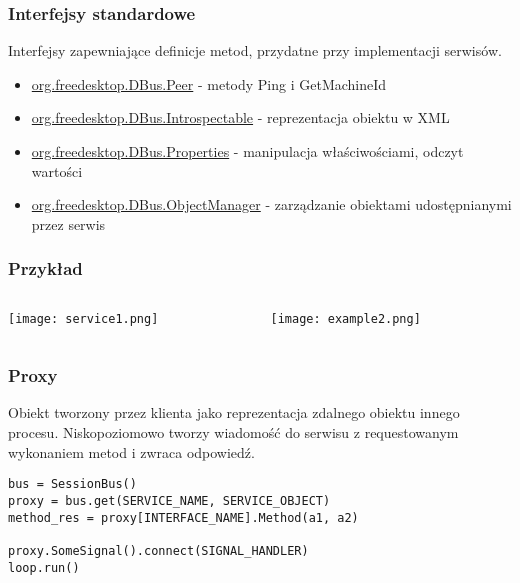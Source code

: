 \begin{frame}
    \frametitle{Interfejsy standardowe}
    Interfejsy zapewniające definicje metod, 
    przydatne przy implementacji serwisów.
    \begin{itemize}
        \item \href{https://dbus.freedesktop.org/doc/dbus-java/api/org/freedesktop/DBus.Peer.html}{org.freedesktop.DBus.Peer} - metody Ping i GetMachineId \pause
        \item \href{https://dbus.freedesktop.org/doc/dbus-java/api/org/freedesktop/DBus.Introspectable.html}{org.freedesktop.DBus.Introspectable} - reprezentacja obiektu w XML \pause
        \item \href{https://dbus.freedesktop.org/doc/dbus-java/api/org/freedesktop/DBus.Properties.html}{org.freedesktop.DBus.Properties} - manipulacja właściwościami, odczyt wartości \pause
        \item \href{URL}{org.freedesktop.DBus.ObjectManager} - zarządzanie obiektami udostępnianymi przez serwis
    \end{itemize}
\end{frame}


\begin{frame}
    \frametitle{Przykład}
    \begin{columns}
    \begin{column}{0.5\textwidth}
        \begin{center}
            \texttt{[image: service1.png]}
        \end{center}
    \end{column}
    \begin{column}{0.5\textwidth}
        \begin{center}
            \texttt{[image: example2.png]}        
        \end{center}
    \end{column}
\end{columns}
\end{frame}



\begin{frame}[fragile]
    \frametitle{Proxy}
    Obiekt tworzony przez klienta jako reprezentacja
    zdalnego obiektu innego procesu. Niskopoziomowo tworzy
    wiadomość do serwisu z requestowanym wykonaniem metod i zwraca
    odpowiedź.

    \begin{flushleft}
        \begin{lstlisting}
bus = SessionBus()
proxy = bus.get(SERVICE_NAME, SERVICE_OBJECT)
method_res = proxy[INTERFACE_NAME].Method(a1, a2)

proxy.SomeSignal().connect(SIGNAL_HANDLER)
loop.run()
        \end{lstlisting}      
    \end{flushleft}

\end{frame}

